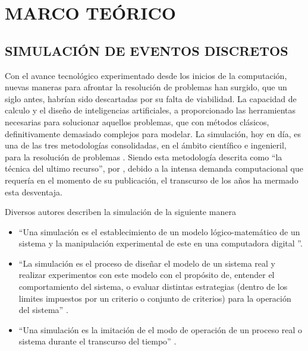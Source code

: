 
\section{MARCO TEÓRICO}

\subsection{SIMULACIÓN DE EVENTOS DISCRETOS}

Con el avance tecnológico experimentado desde los inicios de la computación,
nuevas maneras para afrontar la resolución de problemas han surgido,
que un siglo antes, habrían sido descartadas por su falta de viabilidad.
La capacidad de calculo y el diseño de inteligencias artificiales,
a proporcionado las herramientas necesarias
para solucionar aquellos problemas, que con métodos clásicos,
definitivamente demasiado complejos para modelar.
La simulación, hoy en día, es una de las tres metodologías consolidadas,
en el ámbito científico e ingenieril,
para la resolución de problemas \citep{banks1998handbook}.
Siendo esta metodología descrita como ``la técnica del ultimo recurso'',
por \citep{garzia1986discrete},
debido a la intensa demanda computacional
que requería en el momento de su publicación,
el transcurso de los años ha mermado esta desventaja.

Diversos autores describen la simulación de la siguiente manera

\begin{itemize}
	\item ``Una simulación es
	el establecimiento de un modelo lógico-matemático de un sistema
	y la manipulación experimental de este en una computadora digital
	\citep{pritsker1974gasp}''.   
	\item ``La simulación es el proceso de diseñar
		el modelo de un sistema real y realizar experimentos
		con este modelo con el propósito de,
		entender el comportamiento del sistema,
		o evaluar distintas estrategias
		(dentro de los limites impuestos por un criterio
		o conjunto de criterios)
		para la operación del sistema'' \citep{shannon1976systems}.
	\item ``Una simulación es la imitación de el modo de operación
		de un proceso real o sistema durante el transcurso del tiempo''
		\citep{banks1999introduction}.
\end{itemize}

